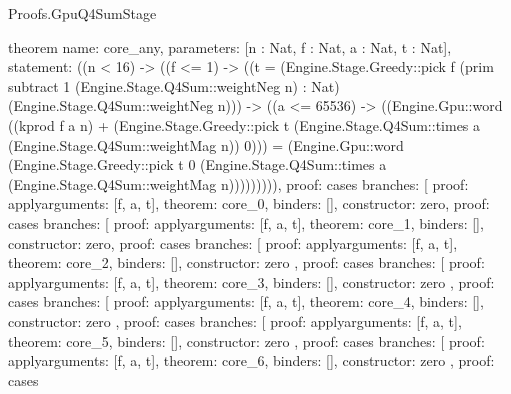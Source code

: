 \begin{lexlean}{Proofs.GpuQ4SumStage}
\begin{semanticmodule}
theorem{
  name: core_any,
  parameters: [n : Nat, f : Nat, a : Nat, t : Nat],
  statement: ((n < 16) -> ((f <= 1) -> ((t = (Engine.Stage.Greedy::pick f (prim subtract 1 (Engine.Stage.Q4Sum::weightNeg n) : Nat) (Engine.Stage.Q4Sum::weightNeg n))) -> ((a <= 65536) -> ((Engine.Gpu::word ((kprod f a n) + (Engine.Stage.Greedy::pick t (Engine.Stage.Q4Sum::times a (Engine.Stage.Q4Sum::weightMag n)) 0))) = (Engine.Gpu::word (Engine.Stage.Greedy::pick t 0 (Engine.Stage.Q4Sum::times a (Engine.Stage.Q4Sum::weightMag n))))))))),
  proof: cases{
    branches: [
      {proof: apply{arguments: [f, a, t], theorem: core_0}, binders: [], constructor: zero},
      {
        proof: cases{
          branches: [
            {proof: apply{arguments: [f, a, t], theorem: core_1}, binders: [], constructor: zero},
            {
              proof: cases{
                branches: [
                  {
                    proof: apply{arguments: [f, a, t], theorem: core_2},
                    binders: [],
                    constructor: zero
                  },
                  {
                    proof: cases{
                      branches: [
                        {
                          proof: apply{arguments: [f, a, t], theorem: core_3},
                          binders: [],
                          constructor: zero
                        },
                        {
                          proof: cases{
                            branches: [
                              {
                                proof: apply{arguments: [f, a, t], theorem: core_4},
                                binders: [],
                                constructor: zero
                              },
                              {
                                proof: cases{
                                  branches: [
                                    {
                                      proof: apply{arguments: [f, a, t], theorem: core_5},
                                      binders: [],
                                      constructor: zero
                                    },
                                    {
                                      proof: cases{
                                        branches: [
                                          {
                                            proof: apply{arguments: [f, a, t], theorem: core_6},
                                            binders: [],
                                            constructor: zero
                                          },
                                          {
                                            proof: cases{
}}}}}}}}}}}}}}}}
\end{semanticmodule}
\end{lexlean}
